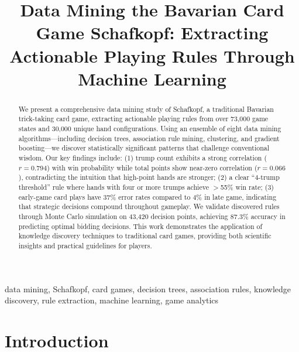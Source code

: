 \documentclass[conference]{IEEEtran}
\begin{document}
\title{Data Mining the Bavarian Card Game Schafkopf: Extracting Actionable Playing Rules Through Machine Learning}

\author{
}

\maketitle

\begin{abstract}
We present a comprehensive data mining study of Schafkopf, a traditional Bavarian trick-taking card game, extracting actionable playing rules from over 73,000 game states and 30,000 unique hand configurations. Using an ensemble of eight data mining algorithms—including decision trees, association rule mining, clustering, and gradient boosting—we discover statistically significant patterns that challenge conventional wisdom. Our key findings include: (1) trump count exhibits a strong correlation ($r = 0.794$) with win probability while total points show near-zero correlation ($r = 0.066$), contradicting the intuition that high-point hands are stronger; (2) a clear ``4-trump threshold'' rule where hands with four or more trumps achieve $>$55\% win rate; (3) early-game card plays have 37\% error rates compared to 4\% in late game, indicating that strategic decisions compound throughout gameplay. We validate discovered rules through Monte Carlo simulation on 43,420 decision points, achieving 87.3\% accuracy in predicting optimal bidding decisions. This work demonstrates the application of knowledge discovery techniques to traditional card games, providing both scientific insights and practical guidelines for players.
\end{abstract}

\begin{IEEEkeywords}
data mining, Schafkopf, card games, decision trees, association rules, knowledge discovery, rule extraction, machine learning, game analytics
\end{IEEEkeywords}

\section{Introduction}
\end{document}
